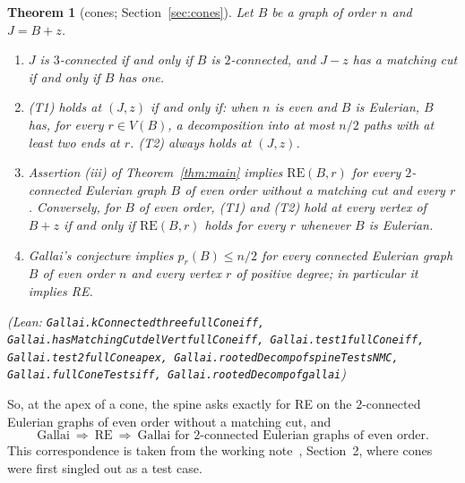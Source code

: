 \documentclass[11pt]{amsart}
\newtheorem{theorem}{Theorem}[section]
\theoremstyle{definition}
\theoremstyle{remark}
\renewcommand{\_}{\oldunderscore\allowbreak}
\newcommand{\leanst}[1]{\par{\raggedright\small\textup{(Lean: \texttt{#1})}\par}}
\newcommand{\RE}{\mathrm{RE}}
\newcommand{\pr}{p_r}
\begin{document}
\begin{theorem}[cones; Section~\ref{sec:cones}]\label{thm:cones-intro}
Let $B$ be a graph of order $n$ and $J=B+z$.
\begin{enumerate}[label=\textup{(\alph*)}]
\item $J$ is $3$-connected if and only if $B$ is $2$-connected, and $J-z$ has a matching cut if and
only if $B$ has one.
\item \textup{(T1)} holds at $(J,z)$ if and only if: when $n$ is even and $B$ is Eulerian, $B$
has, for every $r\in V(B)$, a decomposition into at most $n/2$ paths with at least two ends at $r$.
\textup{(T2)} always holds at $(J,z)$.
\item Assertion \textup{(iii)} of Theorem~\ref{thm:main} implies $\RE(B,r)$ for every $2$-connected
Eulerian graph $B$ of even order without a matching cut and every $r$. Conversely, for $B$ of even
order, \textup{(T1)} and \textup{(T2)} hold at every vertex of $B+z$ if and only if $\RE(B,r)$ holds
for every $r$ whenever $B$ is Eulerian.
\item Gallai's conjecture implies $\pr(B)\le n/2$ for every connected Eulerian graph $B$ of even
order $n$ and every vertex $r$ of positive degree; in particular it implies RE.
\end{enumerate}
\leanst{Gallai.kConnected\_three\_fullCone\_iff, Gallai.hasMatchingCut\_delVert\_fullCone\_iff,
Gallai.test1\_fullCone\_iff, Gallai.test2\_fullCone\_apex,
Gallai.rootedDecomp\_of\_spineTestsNMC, Gallai.fullConeTests\_iff,
Gallai.rootedDecomp\_of\_gallai}
\end{theorem}

So, at the apex of a cone, the spine asks exactly for RE on the $2$-connected Eulerian graphs of even
order without a matching cut, and
\[
\text{Gallai}\ \Longrightarrow\ \RE\ \Longrightarrow\ \text{Gallai for $2$-connected Eulerian
graphs of even order.}
\]
This correspondence is taken from the working note~\cite{EC}, Section~2, where cones were first
singled out as a test case.
\end{document}
